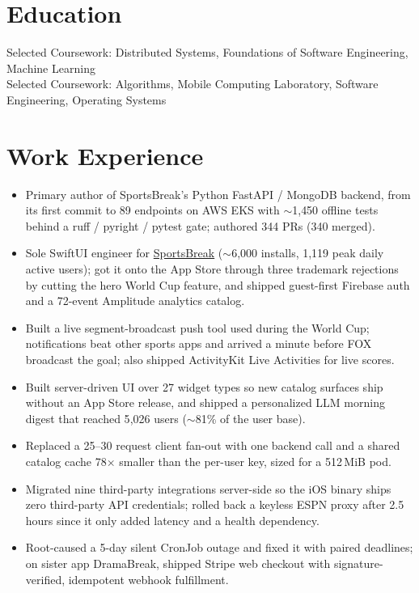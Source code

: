 \documentclass[11pt, letterpaper]{article}
\begin{document}

\section{Education}
Selected Coursework: Distributed Systems, Foundations of Software Engineering, Machine Learning\\[1pt]
Selected Coursework: Algorithms, Mobile Computing Laboratory, Software Engineering, Operating Systems

\section{Work Experience}
\begin{itemize}
  \item Primary author of SportsBreak's Python FastAPI / MongoDB backend, from its first commit to 89 endpoints on AWS EKS with $\sim$1{,}450 offline tests behind a ruff / pyright / pytest gate; authored 344 PRs (340 merged).
  \item Sole SwiftUI engineer for \href{https://apps.apple.com/app/id6762649287}{SportsBreak} ($\sim$6{,}000 installs, 1{,}119 peak daily active users); got it onto the App Store through three trademark rejections by cutting the hero World Cup feature, and shipped guest-first Firebase auth and a 72-event Amplitude analytics catalog.
  \item Built a live segment-broadcast push tool used during the World Cup; notifications beat other sports apps and arrived a minute before FOX broadcast the goal; also shipped ActivityKit Live Activities for live scores.
  \item Built server-driven UI over 27 widget types so new catalog surfaces ship without an App Store release, and shipped a personalized LLM morning digest that reached 5{,}026 users ($\sim$81\% of the user base).
  \item Replaced a 25--30 request client fan-out with one backend call and a shared catalog cache 78$\times$ smaller than the per-user key, sized for a 512\,MiB pod.
  \item Migrated nine third-party integrations server-side so the iOS binary ships zero third-party API credentials; rolled back a keyless ESPN proxy after 2.5 hours since it only added latency and a health dependency.
  \item Root-caused a 5-day silent CronJob outage and fixed it with paired deadlines; on sister app DramaBreak, shipped Stripe web checkout with signature-verified, idempotent webhook fulfillment.
\end{itemize}
\end{document}
